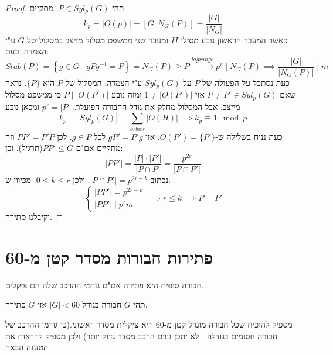 \documentclass{tstextbook}
\begin{document}
\begin{proof}
תהי \(P \in Syl_{p}(G)\). מתקיים:
$$k_{p}=|O(p)|=[G:N_{G}(P)]=\frac{|G|}{|N_{G}|}$$
כאשר המעבר הראשון נובע מסילו \(II\) ומעבר שני ממשפט מסלול מייצב במסלול של \(G\) ע"י הצמדה. כעת:
$$Stab(P)=\left\{  g\in G\mid gPg^{-1} =P  \right\}=N_{G}(P)\geq P\xrightarrow{lagrange} p^r \mid N_{G}(P)\implies \frac{|G|}{|N_{G}(P)|}\mid m$$
כעת נסתכל על הפעולה של \(P\) על \(Syl_{p}(G)\) ע"י הצמדה. המסלול של \(P\) הוא \(\{ P \}\). נראה שאם \(P\neq P'\in Syl_{p}(G)\) אזי \(1\neq|O(P')|\) ומזה נובע \(P\mid|O(P')|\) כי ממשפט מסלול מייצב. אבל המסלול מחלק את גודל החבורה הפועלת, \(p^r=|P|\) ומכאן נובע
$$k_{p}=|Syl_{p}(G)|=\sum_{orbits}|O(H)|\implies k_{p}\equiv 1\mod p$$
כעת נניח בשלילה ש-\(O(P')=\{ P' \}\). אזי \(gP'=P'g\) לכל \(g \in P\). לכן \(PP'=P'P\) וזה מתקיים אם"ם \(PP'\leq G\)(תרגיל). וכן:
$$|PP'|=\frac{|P|\cdot |P'|}{|P\cap P'}=\frac{p^{2r}}{|P\cap P'|}$$
נכתוב \(|P\cap P'|=p^{2r-k}\). ולכן \(0\leq k\leq r\). מכיוון ש:
$$\begin{cases}|PP'|=p^{2r-k} \\|PP'|\mid p^r m
\end{cases}\implies r\leq k\implies P=P'$$
וקיבלנו סתירה.

\end{proof}
\section{פתירות חבורות מסדר קטן מ-60}

\begin{reminder}
חבורה סופית היא פתירה אם"ם גורמי ההרכב שלה הם ציקלים.

\end{reminder}
\begin{proposition}
תהי \(G\) חבורה בגודל \(|G|<60\) אזי \(G\) פתירה.

\end{proposition}
מספיק להוכיח שכל חבורה מוגדל קטן מ-\(60\) היא ציקלית מסדר ראשוני.(כי גורמי ההרכב של חבורה חסומים בגודלה - לא יתכן גורם הרכב מסדר גדול יותר) ולכן מספיק להראות את הטענה הבאה
\end{document}
